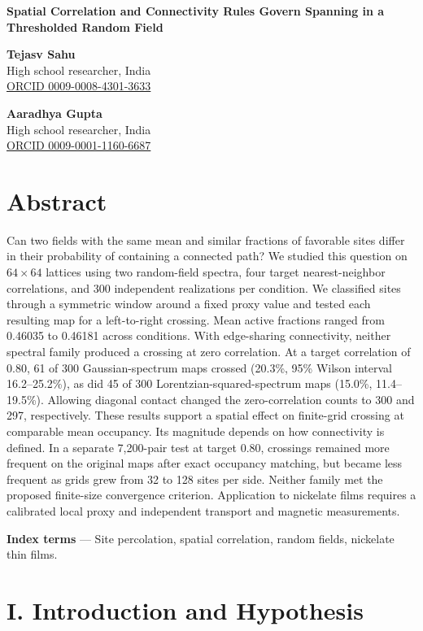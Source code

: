 \documentclass[11pt]{article}
\begin{document}
{\raggedright\LARGE\bfseries Spatial Correlation and Connectivity Rules Govern Spanning in a Thresholded Random Field\par}\medskip

\textbf{Tejasv Sahu}\\
High school researcher, India\\
\href{https://orcid.org/0009-0008-4301-3633}{ORCID 0009-0008-4301-3633}

\textbf{Aaradhya Gupta}\\
High school researcher, India\\
\href{https://orcid.org/0009-0001-1160-6687}{ORCID 0009-0001-1160-6687}

\section*{Abstract}

Can two fields with the same mean and similar fractions of favorable sites differ in their probability of containing a connected path? We studied this question on $64\times 64$ lattices using two random-field spectra, four target nearest-neighbor correlations, and 300 independent realizations per condition. We classified sites through a symmetric window around a fixed proxy value and tested each resulting map for a left-to-right crossing. Mean active fractions ranged from 0.46035 to 0.46181 across conditions. With edge-sharing connectivity, neither spectral family produced a crossing at zero correlation. At a target correlation of 0.80, 61 of 300 Gaussian-spectrum maps crossed (20.3\%, 95\% Wilson interval 16.2–25.2\%), as did 45 of 300 Lorentzian-squared-spectrum maps (15.0\%, 11.4–19.5\%). Allowing diagonal contact changed the zero-correlation counts to 300 and 297, respectively. These results support a spatial effect on finite-grid crossing at comparable mean occupancy. Its magnitude depends on how connectivity is defined. In a separate 7,200-pair test at target 0.80, crossings remained more frequent on the original maps after exact occupancy matching, but became less frequent as grids grew from 32 to 128 sites per side. Neither family met the proposed finite-size convergence criterion. Application to nickelate films requires a calibrated local proxy and independent transport and magnetic measurements.

\textbf{Index terms} — Site percolation, spatial correlation, random fields, nickelate thin films.

\section*{I. Introduction and Hypothesis}
\end{document}
